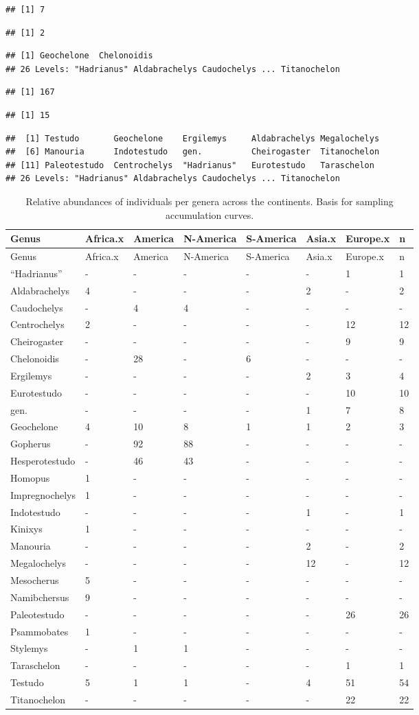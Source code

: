 \documentclass[]{article}
\begin{document}
\begin{verbatim}
## [1] 7
\end{verbatim}

\begin{verbatim}
## [1] 2
\end{verbatim}

\begin{verbatim}
## [1] Geochelone  Chelonoidis
## 26 Levels: "Hadrianus" Aldabrachelys Caudochelys ... Titanochelon
\end{verbatim}

\begin{verbatim}
## [1] 167
\end{verbatim}

\begin{verbatim}
## [1] 15
\end{verbatim}

\begin{verbatim}
##  [1] Testudo       Geochelone    Ergilemys     Aldabrachelys Megalochelys 
##  [6] Manouria      Indotestudo   gen.          Cheirogaster  Titanochelon 
## [11] Paleotestudo  Centrochelys  "Hadrianus"   Eurotestudo   Taraschelon  
## 26 Levels: "Hadrianus" Aldabrachelys Caudochelys ... Titanochelon
\end{verbatim}

\begin{longtable}[]{@{}llllllll@{}}
\caption{Relative abundances of individuals per genera across the
continents. Basis for sampling accumulation curves.}\tabularnewline
\toprule
Genus & Africa.x & America & N-America & S-America & Asia.x & Europe.x &
n\tabularnewline
\midrule
\endfirsthead
\toprule
Genus & Africa.x & America & N-America & S-America & Asia.x & Europe.x &
n\tabularnewline
\midrule
\endhead
``Hadrianus'' & - & - & - & - & - & 1 & 1\tabularnewline
Aldabrachelys & 4 & - & - & - & 2 & - & 2\tabularnewline
Caudochelys & - & 4 & 4 & - & - & - & -\tabularnewline
Centrochelys & 2 & - & - & - & - & 12 & 12\tabularnewline
Cheirogaster & - & - & - & - & - & 9 & 9\tabularnewline
Chelonoidis & - & 28 & - & 6 & - & - & -\tabularnewline
Ergilemys & - & - & - & - & 2 & 3 & 4\tabularnewline
Eurotestudo & - & - & - & - & - & 10 & 10\tabularnewline
gen. & - & - & - & - & 1 & 7 & 8\tabularnewline
Geochelone & 4 & 10 & 8 & 1 & 1 & 2 & 3\tabularnewline
Gopherus & - & 92 & 88 & - & - & - & -\tabularnewline
Hesperotestudo & - & 46 & 43 & - & - & - & -\tabularnewline
Homopus & 1 & - & - & - & - & - & -\tabularnewline
Impregnochelys & 1 & - & - & - & - & - & -\tabularnewline
Indotestudo & - & - & - & - & 1 & - & 1\tabularnewline
Kinixys & 1 & - & - & - & - & - & -\tabularnewline
Manouria & - & - & - & - & 2 & - & 2\tabularnewline
Megalochelys & - & - & - & - & 12 & - & 12\tabularnewline
Mesocherus & 5 & - & - & - & - & - & -\tabularnewline
Namibchersus & 9 & - & - & - & - & - & -\tabularnewline
Paleotestudo & - & - & - & - & - & 26 & 26\tabularnewline
Psammobates & 1 & - & - & - & - & - & -\tabularnewline
Stylemys & - & 1 & 1 & - & - & - & -\tabularnewline
Taraschelon & - & - & - & - & - & 1 & 1\tabularnewline
Testudo & 5 & 1 & 1 & - & 4 & 51 & 54\tabularnewline
Titanochelon & - & - & - & - & - & 22 & 22\tabularnewline
\bottomrule
\end{longtable}
\end{document}
